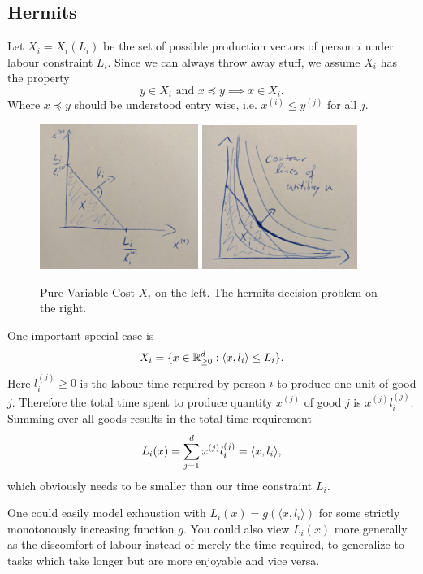 \subsection{Hermits}

Let \(X_i = X_i(L_i)\) be the set of possible production vectors of person \(i\)
under labour constraint \(L_i\). Since we can always throw away stuff, we
assume \(X_i\) has the property
\[
	\label{eq: lower layer}
	\tag{lower layer}
	y\in X_i \text{ and } x\preceq y \implies x\in X_i.
\]
Where \(x \preceq y\) should be understood entry wise, i.e. \(x^{(i)} \le
y^{(j)}\) for all \(j\).

\begin{figure}
	\centering
	\includegraphics[width=0.46\textwidth]{images/pure-variable-cost.jpeg}
	\includegraphics[width=0.45\textwidth]{images/hermit-decision-pure-variable.jpeg}
	\caption{
		Pure Variable Cost \(X_i\) on the left. The hermits decision problem
		on the right.
	}
\end{figure}
\begin{example*}
	One important special case is
	\[
		X_i = \{ x \in \mathbb{R}_{\ge 0}^d: \langle x, l_i \rangle \le L_i \}.
	\]
	Here \(l_i^{(j)}\ge0\) is the labour time required by person \(i\) to produce one
	unit of good \(j\). Therefore the total time spent to produce quantity
	\(x^{(j)}\) of good \(j\) is \(x^{(j)}l_i^{(j)}\). Summing over all goods
	results in the total time requirement
	\[
		L_i(x) = \sum_{j=1}^d x^{(j)}l_i^{(j)} = \langle x, l_i\rangle,
	\]
	which obviously needs to be smaller than our time constraint \(L_i\).

	One could easily model exhaustion with \(L_i(x) = g(\langle x, l_i\rangle)\)
	for some strictly monotonously increasing function \(g\). You could also
	view \(L_i(x)\) more generally as the discomfort of labour instead of merely
	the time required, to generalize to tasks which take longer but are more
	enjoyable and vice versa.
\end{example*}

